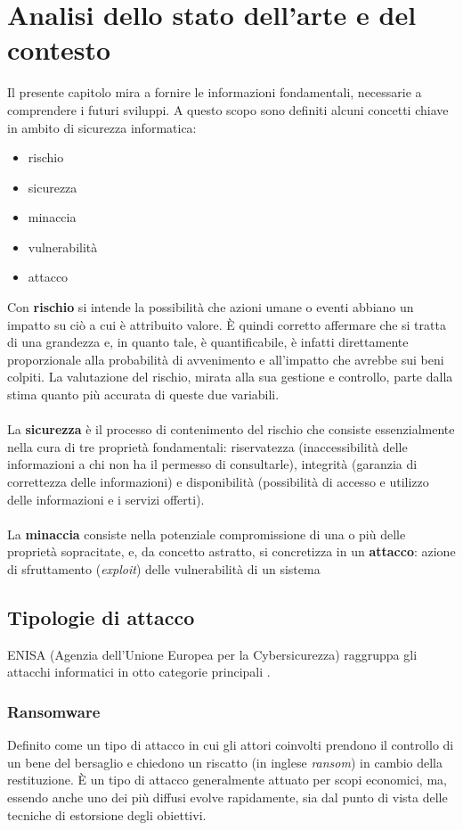 \documentclass[12pt,a4paper,twoside]{report}
\begin{document}
\chapter{Analisi dello stato dell'arte e del contesto}\label{chap:artState}
Il presente capitolo mira a fornire le informazioni fondamentali, necessarie a comprendere i futuri sviluppi. A questo scopo sono definiti alcuni concetti chiave in ambito di sicurezza informatica:
\begin{itemize}
    \item rischio
    \item sicurezza
    \item minaccia
    \item vulnerabilit\`a
    \item attacco
\end{itemize}
Con \textbf{rischio} si intende la possibilit\`a che azioni umane o eventi  abbiano un impatto su ci\`o a cui \`e attribuito valore. \`E quindi corretto affermare che si tratta di una grandezza e, in quanto tale, \`e quantificabile, \`e infatti direttamente proporzionale alla probabilit\`a di avvenimento e all'impatto che avrebbe sui beni colpiti. La valutazione del rischio, mirata alla sua gestione e controllo, parte dalla stima quanto pi\`u accurata di queste due variabili.\\
\\
La \textbf{sicurezza} \`e il processo di contenimento del rischio che consiste essenzialmente nella cura di tre propriet\`a fondamentali: riservatezza (inaccessibilit\`a delle informazioni a chi non ha il permesso di consultarle), integrit\`a (garanzia di correttezza delle informazioni) e disponibilit\`a (possibilit\`a di accesso e utilizzo delle informazioni e i servizi offerti).\\
\\
La \textbf{minaccia} consiste nella potenziale compromissione di una o pi\`u delle propriet\`a sopracitate, e, da concetto astratto, si concretizza in un \textbf{attacco}: azione di sfruttamento (\textit{exploit}) delle vulnerabilit\`a di un sistema\\

\section{Tipologie di attacco}
ENISA (Agenzia dell'Unione Europea per la Cybersicurezza) raggruppa gli attacchi informatici in otto categorie principali \cite{enisa_threat_landscape}.
\subsection{Ransomware}
Definito come un tipo di attacco in cui gli attori coinvolti prendono il controllo di un bene del bersaglio e chiedono un riscatto (in inglese \textit{ransom}) in cambio della restituzione. \`E un tipo di attacco  generalmente attuato per scopi economici, ma, essendo anche uno dei pi\`u diffusi evolve rapidamente, sia dal punto di vista delle tecniche di estorsione degli obiettivi.\\
\end{document}
